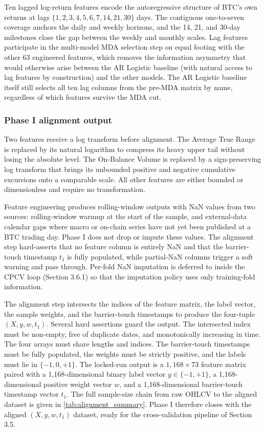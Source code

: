 \documentclass[12pt,a4paper,oneside]{article}
\begin{document}
Ten lagged log-return features encode the autoregressive structure of BTC's own returns at lags $\{1, 2, 3, 4, 5, 6, 7, 14, 21, 30\}$ days. The contiguous one-to-seven coverage anchors the daily and weekly horizons, and the 14, 21, and 30-day milestones close the gap between the weekly and monthly scales. Lag features participate in the multi-model MDA selection step on equal footing with the other 63 engineered features, which removes the information asymmetry that would otherwise arise between the AR Logistic baseline (with natural access to lag features by construction) and the other models. The AR Logistic baseline itself still selects all ten lag columns from the pre-MDA matrix by name, regardless of which features survive the MDA cut.


\subsubsection{Phase I alignment output}\label{subsubsec:alignment}

Two features receive a log transform before alignment. The Average True Range is replaced by its natural logarithm to compress its heavy upper tail without losing the absolute level. The On-Balance Volume is replaced by a sign-preserving log transform that brings its unbounded positive and negative cumulative excursions onto a comparable scale. All other features are either bounded or dimensionless and require no transformation.

Feature engineering produces rolling-window outputs with NaN values from two sources: rolling-window warmup at the start of the sample, and external-data calendar gaps where macro or on-chain series have not yet been published at a BTC trading day. Phase I does not drop or impute these values. The alignment step hard-asserts that no feature column is entirely NaN and that the barrier-touch timestamp $t_1$ is fully populated, while partial-NaN columns trigger a soft warning and pass through. Per-fold NaN imputation is deferred to inside the CPCV loop (Section 3.6.1) so that the imputation policy uses only training-fold information.

The alignment step intersects the indices of the feature matrix, the label vector, the sample weights, and the barrier-touch timestamps to produce the four-tuple $(X, y, w, t_1)$. Several hard assertions guard the output. The intersected index must be non-empty, free of duplicate dates, and monotonically increasing in time. The four arrays must share lengths and indices. The barrier-touch timestamps must be fully populated, the weights must be strictly positive, and the labels must lie in $\{-1, 0, +1\}$. The locked-run output is a $1{,}168 \times 73$ feature matrix paired with a 1,168-dimensional binary label vector $y \in \{-1, +1\}$, a 1,168-dimensional positive weight vector $w$, and a 1,168-dimensional barrier-touch timestamp vector $t_1$. The full sample-size chain from raw OHLCV to the aligned dataset is given in \autoref{tab:alignment_summary}. Phase I therefore closes with the aligned $(X, y, w, t_1)$ dataset, ready for the cross-validation pipeline of Section 3.5.
\end{document}
